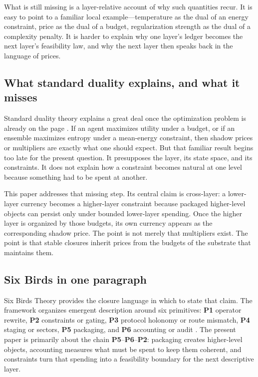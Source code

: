 \documentclass[11pt,a4paper]{article}
\begin{document}
What is still missing is a layer-relative account of why such quantities recur. It is easy to point to a familiar local example---temperature as the dual of an energy constraint, price as the dual of a budget, regularization strength as the dual of a complexity penalty. It is harder to explain why one layer's ledger becomes the next layer's feasibility law, and why the next layer then speaks back in the language of prices.

\subsection{What standard duality explains, and what it misses}

Standard duality theory explains a great deal once the optimization problem is already on the page \cite{boyd2004convex}. If an agent maximizes utility under a budget, or if an ensemble maximizes entropy under a mean-energy constraint, then shadow prices or multipliers are exactly what one should expect. But that familiar result begins too late for the present question. It presupposes the layer, its state space, and its constraints. It does not explain how a constraint becomes natural at one level because something had to be spent at another.

This paper addresses that missing step. Its central claim is cross-layer: a lower-layer currency becomes a higher-layer constraint because packaged higher-level objects can persist only under bounded lower-layer spending. Once the higher layer is organized by those budgets, its own currency appears as the corresponding shadow price. The point is not merely that multipliers exist. The point is that stable closures inherit prices from the budgets of the substrate that maintains them.

\subsection{Six Birds in one paragraph}

Six Birds Theory provides the closure language in which to state that claim. The framework organizes emergent description around six primitives: \textbf{P1} operator rewrite, \textbf{P2} constraints or gating, \textbf{P3} protocol holonomy or route mismatch, \textbf{P4} staging or sectors, \textbf{P5} packaging, and \textbf{P6} accounting or audit \cite{tsiokos2026sixbirds}. The present paper is primarily about the chain \textbf{P5}--\textbf{P6}--\textbf{P2}: packaging creates higher-level objects, accounting measures what must be spent to keep them coherent, and constraints turn that spending into a feasibility boundary for the next descriptive layer.
\end{document}
